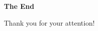 \documentclass[t,aspectratio=169]{beamer}
\begin{document}


\begin{frame}

\vfill
\begin{center}
\textbf{\huge The End}

\bigskip
Thank you for your attention!
\end{center}
\vfill
\end{frame}
\end{document}
